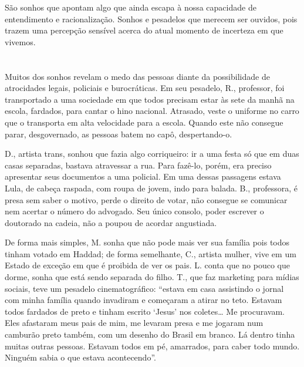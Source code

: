 São sonhos que apontam algo que ainda escapa à nossa capacidade de
entendimento e racionalização. Sonhos e pesadelos que merecem ser
ouvidos, pois trazem uma percepção sensível acerca do atual momento de
incerteza em que vivemos.

\section*{}

Muitos dos sonhos revelam o medo das pessoas diante da possibilidade de
atrocidades legais, policiais e burocráticas. Em seu pesadelo, R.,
professor, foi transportado a uma sociedade em que todos precisam estar
às sete da manhã na escola, fardados, para cantar o hino nacional.
Atrasado, veste o uniforme no carro que o transporta em alta velocidade
para a escola. Quando este não consegue parar, desgovernado, as pessoas
batem no capô, despertando-o.

D., artista trans, sonhou que fazia algo corriqueiro: ir a uma festa só
que em duas casas separadas, bastava atravessar a rua. Para fazê-lo,
porém, era preciso apresentar seus documentos a uma policial. Em uma
dessas passagens estava Lula, de cabeça raspada, com roupa de jovem,
indo para balada. B., professora, é presa sem saber o motivo, perde o
direito de votar, não consegue se comunicar nem acertar o número do
advogado. Seu único consolo, poder escrever o doutorado na cadeia, não a
poupou de acordar angustiada.

De forma mais simples, M. sonha que não pode mais ver sua família pois
todos tinham votado em Haddad; de forma semelhante, C., artista mulher,
vive em um Estado de exceção em que é proibida de ver os pais. L. conta
que no pouco que dorme, sonha que está sendo separada do filho. T., que
faz marketing para mídias sociais, teve um pesadelo cinematográfico:
``estava em casa assistindo o jornal com minha família quando invadiram
e começaram a atirar no teto. Estavam todos fardados de preto e tinham
escrito `Jesus' nos coletes\ldots{} Me procuravam. Eles afastaram meus
pais de mim, me levaram presa e me jogaram num camburão preto também,
com um desenho do Brasil em branco. Lá dentro tinha muitas outras
pessoas. Estavam todos em pé, amarrados, para caber todo mundo. Ninguém
sabia o que estava acontecendo''.

\section*{}

